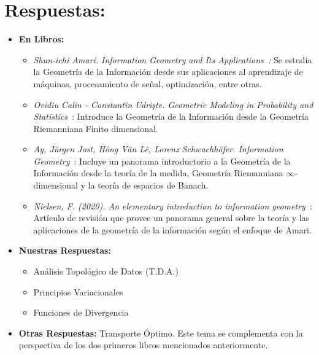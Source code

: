 \section*{Respuestas:}

\begin{itemize}
    \item \textbf{En Libros:}
    \begin{itemize}
        \item \textit{Shun-ichi Amari. Information Geometry and Its Applications~\cite{amari2016information}:} Se estudia la Geometr\'ia de la Informaci\'on desde sus aplicaciones al aprendizaje de m\'aquinas, procesamiento de señal, optimizaci\'on, entre otras. 
        \item \textit{Ovidiu Calin - Constantin Udrişte. Geometric Modeling in Probability and Statistics~\cite{calin2014geometric}}: Introduce la Geometr\'ia de la Informaci\'on desde la Geometr\'ia Riemanniana Finito dimensional. 
        \item \textit{Ay, Jürgen Jost, Hông Vân Lê, Lorenz Schwachhöfer. Information Geometry}~\cite{ay2017information}: Incluye un panorama introductorio a la Geometr\'ia de la Informaci\'on desde la teor\'ia de la medida, Geometr\'ia Riemanniana $\infty$-dimensional y la teor\'ia de espacios de Banach. 
        \item \textit{Nielsen, F. (2020). An elementary introduction to information geometry~\cite{nielsen2020elementary}}: 
        Art\'iculo de revisi\'on que provee un panorama general sobre la teor\'ia y las aplicaciones de la geometr\'ia de la informaci\'on seg\'un el enfoque de Amari.
    \end{itemize}
    \item \textbf{Nuestras Respuestas:}
    \begin{itemize}
        \item An\'alisis Topol\'ogico de Datos (T.D.A.)
        \item Principios Variacionales
        \item Funciones de Divergencia 
    \end{itemize}
    \item \textbf{Otras Respuestas:} Transporte \'Optimo. Este tema se complementa con la perspectiva de los dos primeros libros mencionados anteriormente. 

\end{itemize}
